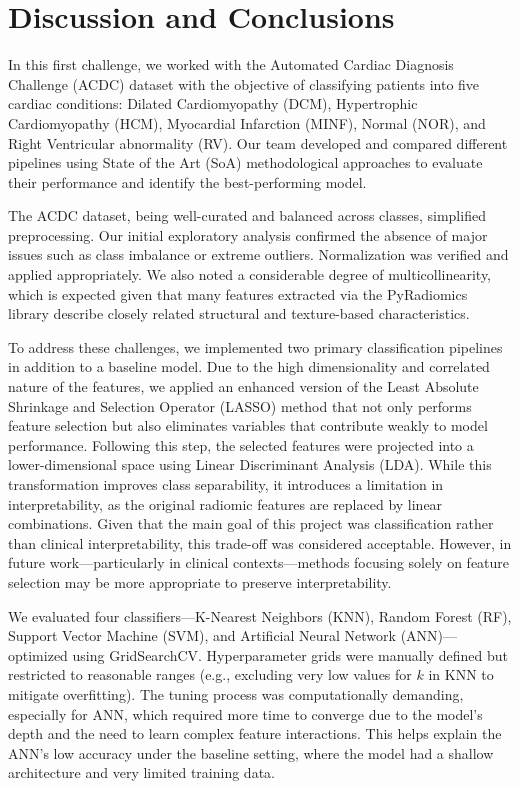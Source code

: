\sloppy

\section{Discussion and Conclusions}

In this first challenge, we worked with the Automated Cardiac Diagnosis
Challenge (ACDC) dataset with the objective of classifying patients into five
cardiac conditions: Dilated Cardiomyopathy (DCM), Hypertrophic Cardiomyopathy
(HCM), Myocardial Infarction (MINF), Normal (NOR), and Right Ventricular
abnormality (RV). Our team developed and compared different pipelines using
State of the Art (SoA) methodological approaches to evaluate their performance
and identify the best-performing model.

The ACDC dataset, being well-curated and balanced across classes, simplified
preprocessing. Our initial exploratory analysis confirmed the absence of major
issues such as class imbalance or extreme outliers. Normalization was verified
and applied appropriately. We also noted a considerable degree of
multicollinearity, which is expected given that many features extracted via the
PyRadiomics library describe closely related structural and texture-based
characteristics.

To address these challenges, we implemented two primary classification
pipelines in addition to a baseline model. Due to the high dimensionality and
correlated nature of the features, we applied an enhanced version of the Least
Absolute Shrinkage and Selection Operator (LASSO) method that not only performs
feature selection but also eliminates variables that contribute weakly to model
performance. Following this step, the selected features were projected into a
lower-dimensional space using Linear Discriminant Analysis (LDA). While this
transformation improves class separability, it introduces a limitation in
interpretability, as the original radiomic features are replaced by linear
combinations. Given that the main goal of this project was classification
rather than clinical interpretability, this trade-off was considered
acceptable. However, in future work—particularly in clinical contexts—methods
focusing solely on feature selection may be more appropriate to preserve
interpretability.

We evaluated four classifiers—K-Nearest Neighbors (KNN), Random Forest (RF),
Support Vector Machine (SVM), and Artificial Neural Network (ANN)—optimized
using GridSearchCV. Hyperparameter grids were manually defined but restricted
to reasonable ranges (e.g., excluding very low values for \(k\) in KNN to
mitigate overfitting). The tuning process was computationally demanding,
especially for ANN, which required more time to converge due to the model’s
depth and the need to learn complex feature interactions. This helps explain
the ANN’s low accuracy under the baseline setting, where the model had a
shallow architecture and very limited training data.

